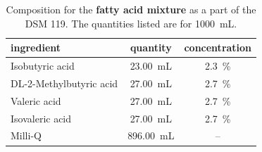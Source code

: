 
\begin{table}[ht]
	\centering
	\caption[Composition for the \textbf{fatty acid mixture} as a part of the DSM 119.]{Composition for the \textbf{fatty acid mixture} as a part of the DSM 119. The quantities listed are for 1000~mL.}
	\label{tab:fat_acid_mix}
	\begin{tabular}{lcc}
		\toprule
		ingredient & quantity & concentration  \\
		\midrule
		Isobutyric acid & 23.00~mL & 2.3~\% \\
		DL-2-Methylbutyric acid & 27.00~mL & 2.7~\%\\
		Valeric acid & 27.00~mL & 2.7~\%\\
		Isovaleric acid & 27.00~mL & 2.7~\%\\
		Milli-Q \ch{H2O} & 896.00~mL & --\\
		\bottomrule	
	\end{tabular}
\end{table}